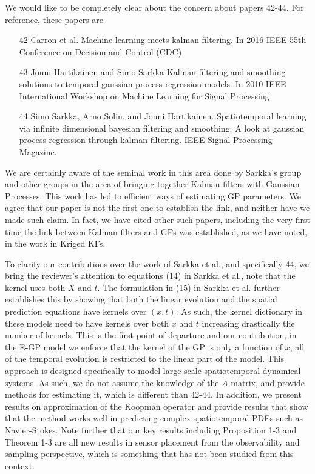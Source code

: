 \documentclass{letter}
\begin{document}
We would like to be completely clear about the concern about papers 42-44. For reference, these papers are
\begin{itemize}
	\item [42] Carron et al. Machine learning meets kalman filtering. In 2016 IEEE 55th Conference on Decision and Control (CDC)
	\item [43] Jouni Hartikainen and Simo Sarkka Kalman filtering and smoothing solutions to temporal gaussian process regression models. In 2010 IEEE International Workshop on Machine Learning for Signal Processing
	\item [44] Simo Sarkka, Arno Solin, and Jouni Hartikainen. Spatiotemporal learning via infinite dimensional bayesian filtering and smoothing: A look at gaussian process regression through kalman filtering. IEEE Signal Processing Magazine.
\end{itemize}
We are certainly aware of the seminal work in this area done by Sarkka's group and other groups in the area of bringing together Kalman filters with Gaussian Processes. This work has led to efficient ways of estimating GP parameters. We agree that our paper is not the first one to establish the link, and neither have we made such claim. In fact, we have cited other such papers, including the very first time the link between Kalman filters and GPs was established, as we have noted, in the work in Kriged KFs.  

To clarify our contributions over  the work of Sarkka et al., and specifically 44, we bring the reviewer's attention to equations (14) in Sarkka et al., note that the kernel uses both $X$ and $t$. The formulation in (15) in Sarkka et al. further establishes this by showing that both the linear evolution and the spatial prediction equations have kernels over $(x,t)$. As such, the kernel dictionary in these models need to have kernels over both $x$ and $t$ increasing drastically the number of kernels. This is the first point of departure and our contribution, in the E-GP model we enforce that the kernel of the GP is only a function of $x$, all of the temporal evolution is restricted to the linear part of the model. This approach is designed specifically to model large scale spatiotemporal dynamical systems. As such, we do not assume the knowledge of the $A$ matrix, and provide methods for estimating it, which is different than 42-44. In addition, we present results on approximation of the Koopman operator and provide results that show that the method works well in predicting complex spatiotemporal PDEs such as Navier-Stokes. Note further that our key results including Proposition 1-3 and Theorem 1-3 are all new results in sensor placement from the observability and sampling perspective, which is something that has not been studied from this context. 
\end{document}
